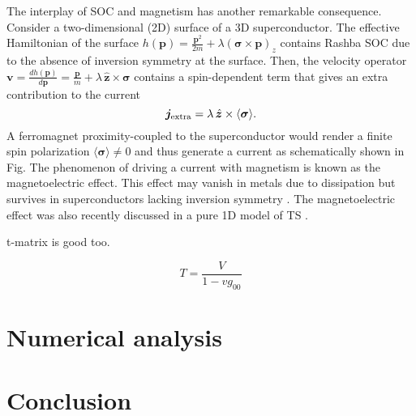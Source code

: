 \documentclass[twocolumn,showpacs,floatfix,nofootinbib,longbibliography]{revtex4-1}
\begin{document}
The interplay of SOC and magnetism has another remarkable consequence. Consider a two-dimensional (2D) surface of a 3D superconductor. The effective Hamiltonian of the surface $h(\bm p) = \frac{{\bm p}^2}{2m} + \lambda\left( \bm\sigma\times\bm p\right)_z$ contains Rashba SOC due to the absence of inversion symmetry at the surface. Then, the velocity operator $\bm v= {\frac{dh(\bm p)}{d\bm p} =\frac{\bm p}{m}+ \lambda \,\hat{\bm z}\times\bm\sigma}$ contains a spin-dependent term that gives an extra contribution to the current
\begin{equation}
	\bm j_{\rm extra} = \lambda\,  \hat{\bm z}\times\langle\bm\sigma\rangle . \label{main}
\end{equation}
A ferromagnet proximity-coupled to the superconductor would render a finite spin polarization $\langle \bm \sigma \rangle \neq 0$ and thus generate a current as schematically shown in Fig. The phenomenon of driving a current with magnetism is known as the magnetoelectric effect. This effect may vanish in metals due to dissipation but survives in superconductors lacking inversion symmetry \cite{Levitov1985, Edelstein1989, Edelstein1995, Yip2001, BauerSigrist2012}. The magnetoelectric effect was also recently discussed in a pure 1D model of TS \cite{Ojanen2012}. 

t-matrix is good too.

\begin{equation}
 T = \frac{V}{1-vg_{00}}
\end{equation}

\section{Numerical analysis} \label{sec:numerics}



\section{Conclusion} \label{sec:conclusion}




\newpage
%

\end{document}
